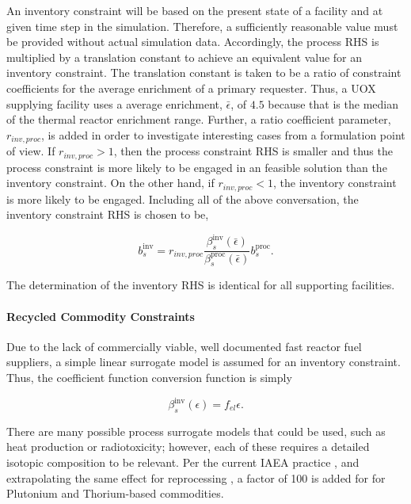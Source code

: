An inventory constraint will be based on the present state of a facility and at
given time step in the simulation. Therefore, a sufficiently reasonable value
must be provided without actual simulation data. Accordingly, the process RHS is
multiplied by a translation constant to achieve an equivalent value for an
inventory constraint. The translation constant is taken to be a ratio of
constraint coefficients for the average enrichment of a primary requester. Thus,
a UOX supplying facility uses a average enrichment, $\bar{\epsilon}$, of $4.5$
because that is the median of the thermal reactor enrichment range. Further, a
ratio coefficient parameter, $r_{inv, proc}$, is added in order to investigate
interesting cases from a formulation point of view. If $r_{inv, proc} > 1$, then
the process constraint RHS is smaller and thus the process constraint is more
likely to be engaged in an feasible solution than the inventory constraint. On
the other hand, if $r_{inv, proc} < 1$, the inventory constraint is more likely
to be engaged. Including all of the above conversation, the inventory constraint RHS is chosen to be,

\begin{equation}
b^{\text{inv}}_s = 
r_{inv, proc} 
\frac{\beta^{\text{inv}}_s(\bar{\epsilon})}{\beta^{\text{proc}}_s(\bar{\epsilon})} 
b^{\text{proc}}_s.
\end{equation}

The determination of the inventory RHS is identical for all supporting
facilities.

\paragraph{Recycled Commodity Constraints}

Due to the lack of commercially viable, well documented fast reactor fuel
suppliers, a simple linear surrogate model is assumed for an inventory
constraint. Thus, the coefficient function conversion function is simply 

\begin{equation}
\beta^{\text{inv}}_s(\epsilon) = f_{el} \epsilon. 
\end{equation}

There are many possible process surrogate models that could be used, such as
heat production or radiotoxicity; however, each of these requires a detailed
isotopic composition to be relevant. Per the current IAEA practice
\cite{heinonen2010}, and extrapolating the same effect for reprocessing
, a factor of 100 is added for for Plutonium and Thorium-based
commodities.


